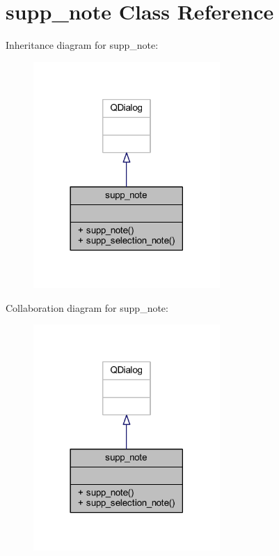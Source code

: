 \hypertarget{classsupp__note}{}\section{supp\+\_\+note Class Reference}
\label{classsupp__note}


Inheritance diagram for supp\+\_\+note\+:\nopagebreak
\begin{figure}[H]
\begin{center}
\leavevmode
\includegraphics[width=201pt]{classsupp__note__inherit__graph}
\end{center}
\end{figure}


Collaboration diagram for supp\+\_\+note\+:\nopagebreak
\begin{figure}[H]
\begin{center}
\leavevmode
\includegraphics[width=201pt]{classsupp__note__coll__graph}
\end{center}
\end{figure}
